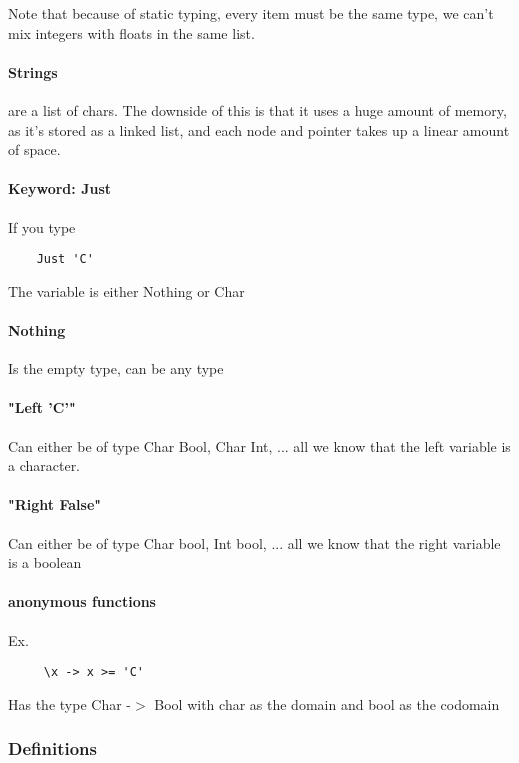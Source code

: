 \documentclass[12pt]{article}
\begin{document}
Note that because of static typing, every item must be the same type, we can't mix integers with floats in the same list.

\paragraph{Strings} are a list of chars. The downside of this is that it uses a huge amount of memory, as it's stored as a linked list, and each node and pointer takes up a linear amount of space.

\paragraph{Keyword: Just} If you type

\begin{lstlisting}
	Just 'C'
\end{lstlisting}

The variable is either Nothing or Char

\paragraph{Nothing} Is the empty type, can be any type

\paragraph{"Left 'C'"} Can either be of type Char Bool, Char Int,  ... all we know that the left variable is a character.

\paragraph{"Right False"} Can either be of type Char bool, Int bool, ... all we know that the right variable is a boolean

\paragraph{anonymous functions} Ex.

\begin{lstlisting}
	 \x -> x >= 'C'
\end{lstlisting}

Has the type Char -$>$ Bool with char as the domain and bool as the codomain

\subsubsection{Definitions}
\end{document}
